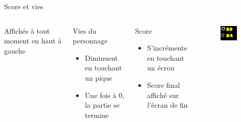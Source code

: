 \documentclass{beamer}
\begin{document}
{\begin{frame}{Score et vies}
    \begin{columns}
            Affichés à tout moment en haut à gauche
            \begin{block}{Vies du personnage}
                \begin{itemize}
                    \item[\bullet] Diminuent en touchant un pique
                    \item[\bullet] Une fois à 0, la partie se termine
                \end{itemize}
            \end{block}
            \begin{block}{Score}
                \begin{itemize}
                    \item[\bullet] S'incrémente en touchant un écrou
                    \item[\bullet] Score final affiché sur l'écran de fin
                \end{itemize}
            \end{block}
            \begin{figure}
                \centering
                \includegraphics[width=0.8\textwidth]{Screenshot from 2025-03-23 23-14-37}
            \end{figure}
    \end{columns}
\end{frame}

}
\end{document}
